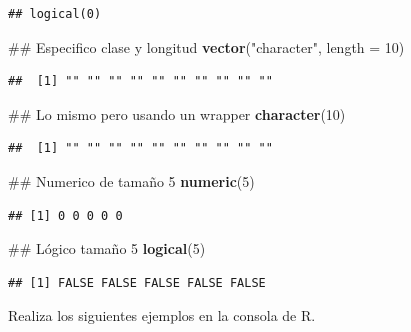 \documentclass[]{article}
\newenvironment{Shaded}{\begin{snugshade}}{\end{snugshade}}
\newcommand{\KeywordTok}[1]{\textcolor[rgb]{0.13,0.29,0.53}{\textbf{{#1}}}}
\newcommand{\DataTypeTok}[1]{\textcolor[rgb]{0.13,0.29,0.53}{{#1}}}
\newcommand{\DecValTok}[1]{\textcolor[rgb]{0.00,0.00,0.81}{{#1}}}
\newcommand{\StringTok}[1]{\textcolor[rgb]{0.31,0.60,0.02}{{#1}}}
\newcommand{\NormalTok}[1]{{#1}}
\begin{document}
\begin{verbatim}
## logical(0)
\end{verbatim}

\begin{Shaded}
\begin{Highlighting}[]
\NormalTok{## Especifico clase y longitud}
\KeywordTok{vector}\NormalTok{(}\StringTok{"character"}\NormalTok{, }\DataTypeTok{length =} \DecValTok{10}\NormalTok{)}
\end{Highlighting}
\end{Shaded}

\begin{verbatim}
##  [1] "" "" "" "" "" "" "" "" "" ""
\end{verbatim}

\begin{Shaded}
\begin{Highlighting}[]
\NormalTok{## Lo mismo pero usando un wrapper}
\KeywordTok{character}\NormalTok{(}\DecValTok{10}\NormalTok{)}
\end{Highlighting}
\end{Shaded}

\begin{verbatim}
##  [1] "" "" "" "" "" "" "" "" "" ""
\end{verbatim}

\begin{Shaded}
\begin{Highlighting}[]
\NormalTok{## Numerico de tamaño 5}
\KeywordTok{numeric}\NormalTok{(}\DecValTok{5}\NormalTok{)}
\end{Highlighting}
\end{Shaded}

\begin{verbatim}
## [1] 0 0 0 0 0
\end{verbatim}

\begin{Shaded}
\begin{Highlighting}[]
\NormalTok{## Lógico tamaño 5}
\KeywordTok{logical}\NormalTok{(}\DecValTok{5}\NormalTok{)}
\end{Highlighting}
\end{Shaded}

\begin{verbatim}
## [1] FALSE FALSE FALSE FALSE FALSE
\end{verbatim}

Realiza los siguientes ejemplos en la consola de R.
\end{document}
